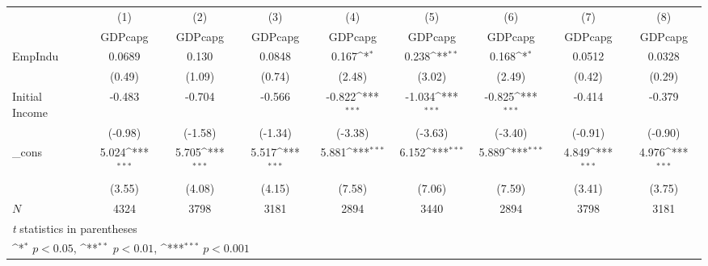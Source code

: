 \documentclass{article}
\begin{document}
{
\def\sym#1{\ifmmode^{#1}\else\(^{#1}\)\fi}
\begin{tabular}{l*{8}{c}}
\hline\hline
            &\multicolumn{1}{c}{(1)}&\multicolumn{1}{c}{(2)}&\multicolumn{1}{c}{(3)}&\multicolumn{1}{c}{(4)}&\multicolumn{1}{c}{(5)}&\multicolumn{1}{c}{(6)}&\multicolumn{1}{c}{(7)}&\multicolumn{1}{c}{(8)}\\
            &\multicolumn{1}{c}{GDPcapg}&\multicolumn{1}{c}{GDPcapg}&\multicolumn{1}{c}{GDPcapg}&\multicolumn{1}{c}{GDPcapg}&\multicolumn{1}{c}{GDPcapg}&\multicolumn{1}{c}{GDPcapg}&\multicolumn{1}{c}{GDPcapg}&\multicolumn{1}{c}{GDPcapg}\\
\hline
EmpIndu     &      0.0689         &       0.130         &      0.0848         &       0.167\sym{*}  &       0.238\sym{**} &       0.168\sym{*}  &      0.0512         &      0.0328         \\
            &      (0.49)         &      (1.09)         &      (0.74)         &      (2.48)         &      (3.02)         &      (2.49)         &      (0.42)         &      (0.29)         \\
[1em]
Initial Income   &      -0.483         &      -0.704         &      -0.566         &      -0.822\sym{***}&      -1.034\sym{***}&      -0.825\sym{***}&      -0.414         &      -0.379         \\
            &     (-0.98)         &     (-1.58)         &     (-1.34)         &     (-3.38)         &     (-3.63)         &     (-3.40)         &     (-0.91)         &     (-0.90)         \\
[1em]
\_cons      &       5.024\sym{***}&       5.705\sym{***}&       5.517\sym{***}&       5.881\sym{***}&       6.152\sym{***}&       5.889\sym{***}&       4.849\sym{***}&       4.976\sym{***}\\
            &      (3.55)         &      (4.08)         &      (4.15)         &      (7.58)         &      (7.06)         &      (7.59)         &      (3.41)         &      (3.75)         \\
\hline
\(N\)       &        4324         &        3798         &        3181         &        2894         &        3440         &        2894         &        3798         &        3181         \\
\hline\hline
\multicolumn{9}{l}{\footnotesize \textit{t} statistics in parentheses}\\
\multicolumn{9}{l}{\footnotesize \sym{*} \(p<0.05\), \sym{**} \(p<0.01\), \sym{***} \(p<0.001\)}\\
\end{tabular}
}
\end{document}
